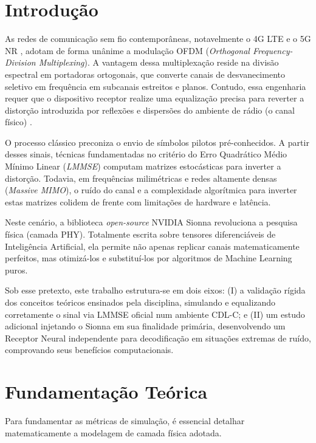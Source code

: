 \documentclass[conference]{IEEEtran}
\begin{document}
\section{Introdução}

As redes de comunicação sem fio contemporâneas, notavelmente o 4G LTE e o 5G NR \cite{3gpp38211}, adotam de forma unânime a modulação OFDM (\textit{Orthogonal Frequency-Division Multiplexing}). A vantagem dessa multiplexação reside na divisão espectral em portadoras ortogonais, que converte canais de desvanecimento seletivo em frequência em subcanais estreitos e planos. Contudo, essa engenharia requer que o dispositivo receptor realize uma equalização precisa para reverter a distorção introduzida por reflexões e dispersões do ambiente de rádio (o canal físico) \cite{goldsmith2005}.

O processo clássico preconiza o envio de símbolos pilotos pré-conhecidos. A partir desses sinais, técnicas fundamentadas no critério do Erro Quadrático Médio Mínimo Linear (\textit{LMMSE}) computam matrizes estocásticas para inverter a distorção. Todavia, em frequências milimétricas e redes altamente densas (\textit{Massive MIMO}), o ruído do canal e a complexidade algorítmica para inverter estas matrizes colidem de frente com limitações de hardware e latência.

Neste cenário, a biblioteca \textit{open-source} NVIDIA Sionna \cite{hoydis2022} revoluciona a pesquisa física (camada PHY). Totalmente escrita sobre tensores diferenciáveis de Inteligência Artificial, ela permite não apenas replicar canais matematicamente perfeitos, mas otimizá-los e substituí-los por algoritmos de Machine Learning puros.

Sob esse pretexto, este trabalho estrutura-se em dois eixos: (I) a validação rígida dos conceitos teóricos ensinados pela disciplina, simulando e equalizando corretamente o sinal via LMMSE oficial num ambiente CDL-C; e (II) um estudo adicional injetando o Sionna em sua finalidade primária, desenvolvendo um Receptor Neural independente para decodificação em situações extremas de ruído, comprovando seus benefícios computacionais.

\section{Fundamentação Teórica}

Para fundamentar as métricas de simulação, é essencial detalhar matematicamente a modelagem de camada física adotada.
\end{document}
